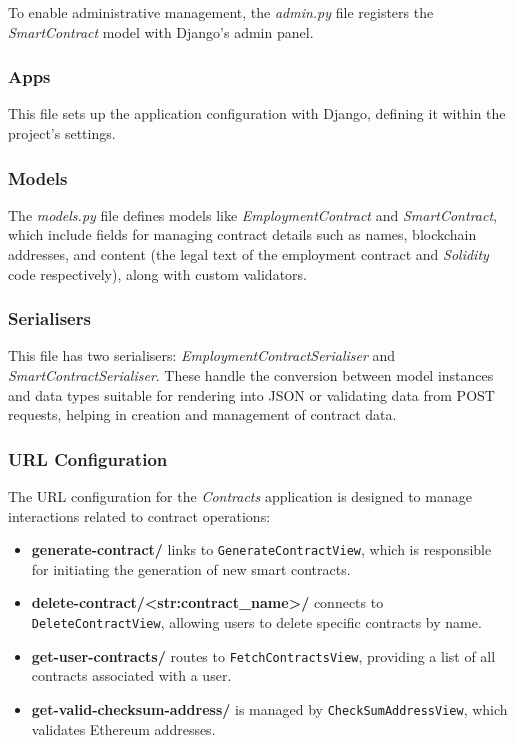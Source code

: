 To enable administrative management, the \textit{admin.py} file registers the \textit{SmartContract} model with Django's admin panel.

\subsubsection{Apps} 

This file sets up the application configuration with Django, defining it within the project's settings.

\subsubsection{Models} 

The \textit{models.py} file defines models like \textit{EmploymentContract} and \textit{SmartContract}, which include fields for managing contract details such as names, blockchain addresses, and content (the legal text of the employment contract and \textit{Solidity} code respectively), along with custom validators.

\subsubsection{Serialisers}

This file has two serialisers: \textit{EmploymentContractSerialiser} and \textit{SmartContractSerialiser}. These handle the conversion between model instances and data types suitable for rendering into JSON or validating data from POST requests, helping in creation and management of contract data.

\subsubsection{URL Configuration}

The URL configuration for the \textit{Contracts} application is designed to manage interactions related to contract operations:

\begin{itemize}
    \item \textbf{generate-contract/} links to \texttt{GenerateContractView}, which is responsible for initiating the generation of new smart contracts.
    \item \textbf{delete-contract/<str:contract\_name>/} connects to \texttt{DeleteContractView}, allowing users to delete specific contracts by name.
    \item \textbf{get-user-contracts/} routes to \texttt{FetchContractsView}, providing a list of all contracts associated with a user.
    \item \textbf{get-valid-checksum-address/} is managed by \texttt{CheckSumAddressView}, which validates Ethereum addresses.
\end{itemize}

